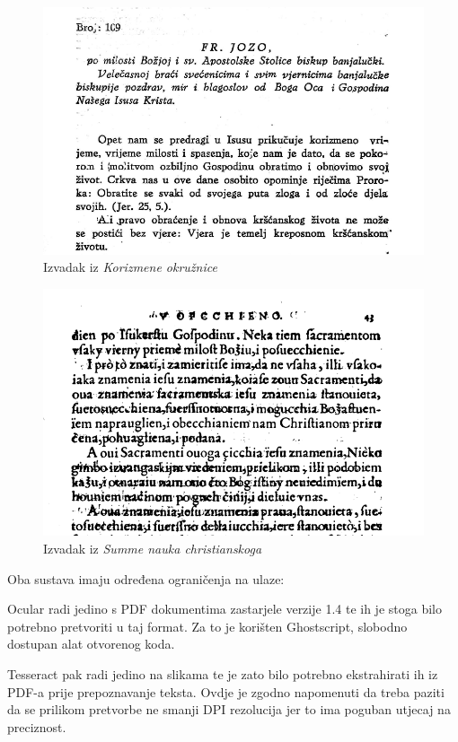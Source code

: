 \documentclass[zavrsnirad]{fer}
\begin{document}
\begin{figure}[h!]
	\centering
	\includegraphics[width=1.0\linewidth]{Figures/korizmena.png} 
	\caption{Izvadak iz \textit{Korizmene okružnice}}
	\label{slk:korizmena}
\end{figure}

\begin{figure}[h!]
	\centering
	\includegraphics[width=1.0\linewidth]{Figures/summa.png} 
	\caption{Izvadak iz \textit{Summe nauka christianskoga}}
	\label{slk:summa}
\end{figure}

Oba sustava imaju određena ograničenja na ulaze: 

Ocular radi jedino s PDF dokumentima zastarjele verzije 1.4 te ih je stoga bilo potrebno pretvoriti u taj format. Za to je korišten Ghostscript, \cite{Ghostscript} slobodno dostupan alat otvorenog koda. 

Tesseract pak radi jedino na slikama te je zato bilo potrebno ekstrahirati ih iz PDF-a prije prepoznavanje teksta. Ovdje je zgodno napomenuti da treba paziti da se prilikom pretvorbe ne smanji DPI rezolucija jer to ima poguban utjecaj na preciznost.
\end{document}
